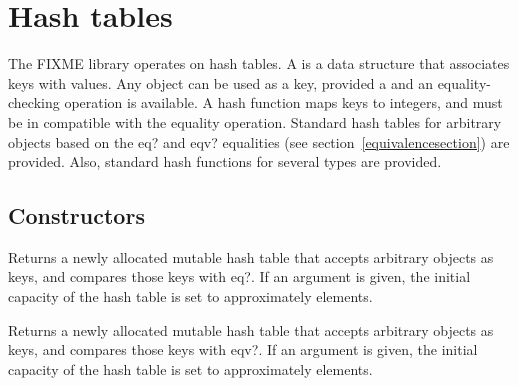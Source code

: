 \section{Hash tables}
\label{hashtablesection}

The FIXME library operates on hash tables.
A  is a data structure that associates keys with values.
Any object can be used as a key, provided a 
and an equality-checking operation is available.  A hash function maps
keys to integers, and must be in compatible with the equality
operation.  Standard hash tables for arbitrary objects based on the
{\cf eq?} and {\cf eqv?} equalities (see
section~\ref{equivalencesection}) are provided.  Also, standard hash
functions for several types are provided.

\subsection{Constructors}


\begin{entry}{%
}

Returns a newly allocated mutable hash table that accepts arbitrary objects as keys, 
and compares those keys with {\cf eq?}. If an argument is given, the initial 
capacity of the hash table is set to approximately  elements.

\end{entry}

\begin{entry}{%
}

Returns a newly allocated mutable hash table that accepts arbitrary objects as keys, 
and compares those keys with {\cf eqv?}.
If an argument is given, the initial 
capacity of the hash table is set to approximately  elements.

\end{entry}

